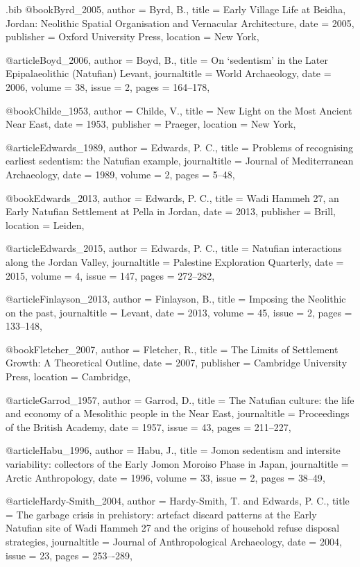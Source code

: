 \begin{filecontents}{\IJSRAidentifier.bib}
@book{Byrd_2005,
	author = {Byrd, B.},
	title = {Early Village Life at Beidha, Jordan: Neolithic Spatial Organisation and Vernacular Architecture},
	date = {2005},
	publisher = {Oxford University Press},
	location = {New York},
}

@article{Boyd_2006,
	author = {Boyd, B.},
	title = {On ‘sedentism’ in the Later Epipalaeolithic (Natufian) Levant},
	journaltitle = {World Archaeology},
	date = {2006},
	volume = {38},
	issue = {2},
	pages = {164--178},
}

@book{Childe_1953,
	author = {Childe, V.},
	title = {New Light on the Most Ancient Near East},
	date = {1953},
	publisher = {Praeger},
	location = {New York},
}

@article{Edwards_1989,
	author = {Edwards, P. C.},
	title = {Problems of recognising earliest sedentism: the Natufian example},
	journaltitle = {Journal of Mediterranean Archaeology},
	date = {1989},
	volume = {2},
	pages = {5--48},
}

@book{Edwards_2013,
	author = {Edwards, P. C.},
	title = {Wadi Hammeh 27, an Early Natufian Settlement at Pella in Jordan},
	date = {2013},
	publisher = {Brill},
	location = {Leiden},
}

@article{Edwards_2015,
	author = {Edwards, P. C.},
	title = {Natufian interactions along the Jordan Valley},
	journaltitle = {Palestine Exploration Quarterly},
	date = {2015},
	volume = {4},
	issue = {147},
	pages = {272--282},
}

@article{Finlayson_2013,
	author = {Finlayson, B.},
	title = {Imposing the Neolithic on the past},
	journaltitle = {Levant},
	date = {2013},
	volume = {45},
	issue = {2},
	pages = {133--148},
}


@book{Fletcher_2007,
	author = {Fletcher, R.},
	title = {The Limits of Settlement Growth: A Theoretical Outline},
	date = {2007},
	publisher = {Cambridge University Press},
	location = {Cambridge},
}

@article{Garrod_1957,
	author = {Garrod, D.},
	title = {The Natufian culture: the life and economy of a Mesolithic people in the Near East},
	journaltitle = {Proceedings of the British Academy},
	date = {1957},
	issue = {43},
	pages = {211--227},
}

@article{Habu_1996,
	author = {Habu, J.},
	title = {Jomon sedentism and intersite variability: collectors of the Early Jomon Moroiso Phase in Japan},
	journaltitle = {Arctic Anthropology},
	date = {1996},
	volume = {33},
	issue = {2},
	pages = {38--49},
}

@article{Hardy-Smith_2004,
	author = {Hardy-Smith, T. and Edwards, P. C.},
	title = {The garbage crisis in prehistory: artefact discard patterns at the Early Natufian site of Wadi Hammeh 27 and the origins of household refuse disposal strategies},
	journaltitle = {Journal of Anthropological Archaeology},
	date = {2004},
	issue = {23},
	pages = {253–-289},
}


\end{filecontents}

